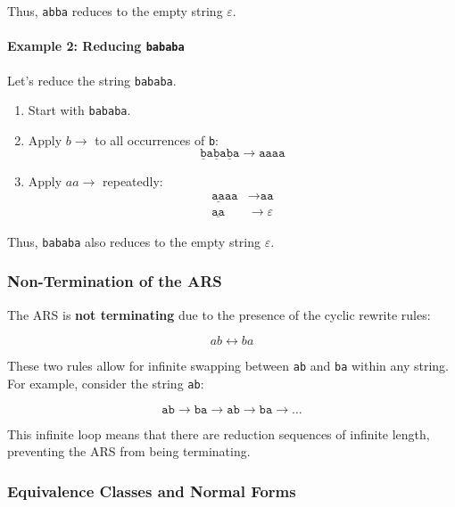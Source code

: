 \documentclass{article}
\begin{document}
Thus, \texttt{abba} reduces to the empty string $\varepsilon$.

\paragraph{Example 2: Reducing \texttt{bababa}}

Let's reduce the string \texttt{bababa}.

\begin{enumerate}
    \item Start with \texttt{bababa}.
    \item Apply $b \to$ to all occurrences of \texttt{b}:
    \begin{equation*}
        \underline{\texttt{b}}\texttt{a}\underline{\texttt{b}}\texttt{a}\underline{\texttt{b}}\texttt{a} \to \texttt{aaaa}
    \end{equation*}
    \item Apply $aa \to$ repeatedly:
    \begin{align*}
        \underline{\texttt{aa}}\texttt{aa} &\to \texttt{aa} \\
        \underline{\texttt{aa}} &\to \varepsilon
    \end{align*}
\end{enumerate}

Thus, \texttt{bababa} also reduces to the empty string $\varepsilon$.

\subsubsection*{Non-Termination of the ARS}

The ARS is \textbf{not terminating} due to the presence of the cyclic rewrite rules:

\begin{equation*}
    ab \leftrightarrow ba
\end{equation*}

These two rules allow for infinite swapping between \texttt{ab} and \texttt{ba} within any string. For example, consider the string \texttt{ab}:

\begin{equation*}
    \texttt{ab} \to \texttt{ba} \to \texttt{ab} \to \texttt{ba} \to \ldots
\end{equation*}

This infinite loop means that there are reduction sequences of infinite length, preventing the ARS from being terminating.

\subsubsection*{Equivalence Classes and Normal Forms}
\end{document}
